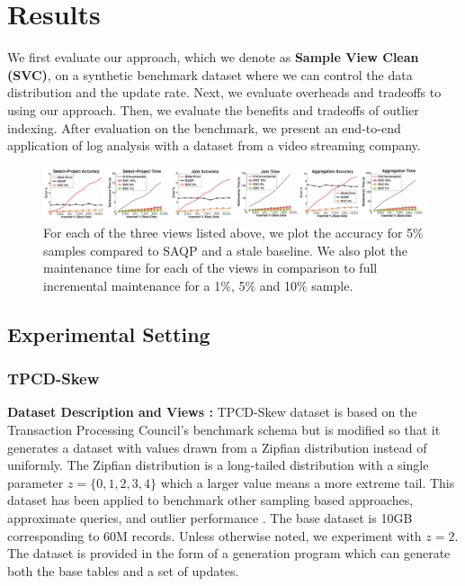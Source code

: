 \section{Results}
\label{exp}
We first evaluate our approach, which we denote as \textbf{Sample View Clean (SVC)}, on a synthetic benchmark dataset where we can control the data distribution and the update rate.
Next, we evaluate overheads and tradeoffs to using our approach.
Then, we evaluate the benefits and tradeoffs of outlier indexing.
After evaluation on the benchmark, we present an end-to-end application of log analysis with a dataset from a video streaming company.

\begin{figure}[ht!]
\hspace{-5.5em}
 \includegraphics[scale=0.19]{exp/exp2-full.eps}
 \caption{For each of the three views listed above, we plot the accuracy for 5\% samples compared to SAQP and a stale baseline. We also plot the maintenance time for each of the views in comparison to full incremental maintenance for a 1\%, 5\% and 10\% sample. \label{exp2update} }
\end{figure}

\subsection{Experimental Setting}
\subsubsection{TPCD-Skew}
{\noindent \bf Dataset Description and Views :}
TPCD-Skew dataset \cite{tpcdskew} is based on the Transaction Processing Council's benchmark
schema but is modified so that it generates a dataset with values drawn from a Zipfian distribution instead of uniformly.
The Zipfian distribution \cite{mitzenmacher2004brief} is a long-tailed distribution with a single parameter $z=\{0,1,2,3,4\}$ which a larger
value means a more extreme tail.
This dataset has been applied to benchmark other sampling based approaches, approximate queries, and outlier performance \cite{chaudhuri2001overcoming, agrawal2005database}.
The base dataset is 10GB corresponding to 60M records.
Unless otherwise noted, we experiment with $z=2$.
The dataset is provided in the form of a generation program which can generate both the base tables and a set of updates.

